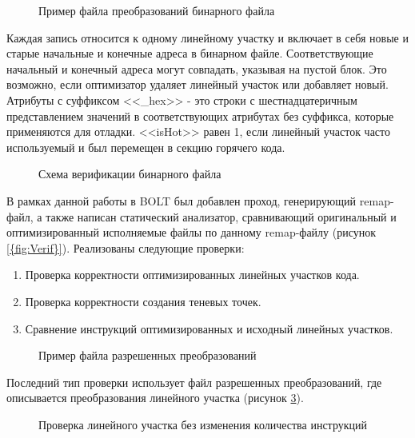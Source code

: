 \begin{figure}[!h]
    \centerfloat{
        \texttt{[image: v1]}
    }
    \caption{Пример файла преобразований бинарного файла}\label{fig:Remap}
\end{figure}

Каждая запись относится к одному линейному участку и включает в себя новые и старые начальные и конечные адреса в бинарном файле. Соответствующие начальный и конечный адреса могут совпадать, указывая на пустой блок. Это возможно, если оптимизатор удаляет линейный участок или добавляет новый. Атрибуты с суффиксом <<\_hex>> - это строки с шестнадцатеричным представлением значений в соответствующих атрибутах без суффикса, которые применяются для отладки. <<isHot>> равен 1, если линейный участок часто используемый и был перемещен в секцию горячего кода.

\begin{figure}[!h]
    \centerfloat{
        \texttt{[image: v2]}
    }
    \caption{Схема верификации бинарного файла}\label{fig:Verif}
\end{figure}

В рамках данной работы в BOLT был добавлен проход, генерирующий remap-файл, а также написан статический анализатор, сравнивающий оригинальный и оптимизированный исполняемые файлы по данному remap-файлу (рисунок \cref{{fig:Verif}}). Реализованы следующие проверки:

\begin{enumerate}[beginpenalty=10000]
  \item Проверка корректности оптимизированных линейных участков кода.
  \item Проверка корректности создания теневых точек.
  \item Сравнение инструкций оптимизированных и исходный линейных участков.
\end{enumerate}	

\begin{figure}[!h]
    \centerfloat{
        \texttt{[image: v3]}
    }
    \caption{Пример файла разрешенных преобразований}\label{fig:Access}
\end{figure}

Последний тип проверки использует файл разрешенных преобразований, где описывается преобразования линейного участка (рисунок \cref{fig:Access}).

\begin{figure}[!h]
    \centerfloat{
        \texttt{[image: v4]}
    }
    \caption{Проверка линейного участка без изменения количества инструкций}\label{fig:VerifEx1}
\end{figure}

